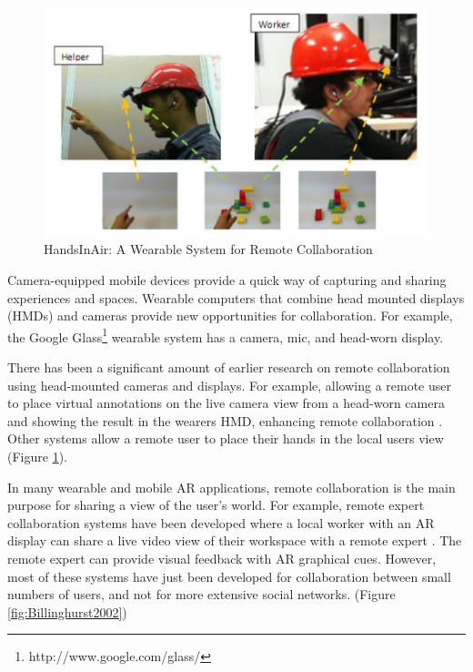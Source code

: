 \begin{figure}
    \centering
    \includegraphics[width=\linewidth]{images/Huang2013.PNG}
    \caption{HandsInAir: A Wearable System for Remote Collaboration}
    \label{fig:HandsInAir}
\end{figure}

Camera-equipped mobile devices provide a quick way of capturing and sharing experiences and spaces. Wearable computers that combine head mounted displays (HMDs) and cameras provide new opportunities for collaboration. For example, the Google Glass\footnote{http://www.google.com/glass/} wearable system has a camera, mic, and head-worn display.

There has been a significant amount of earlier research on remote collaboration using head-mounted cameras and displays. For example, allowing a remote user to place virtual annotations on the live camera view from a head-worn camera and showing the result in the wearers HMD, enhancing remote collaboration \cite{Fussell2003}. Other systems allow a remote user to place their hands in the local users view \cite{Huang2013} (Figure \ref{fig:HandsInAir}). 

In many wearable and mobile AR applications, remote collaboration is the main purpose for sharing a view of the user's world. For example, remote expert collaboration systems have been developed where a local worker with an AR display can share a live video view of their workspace with a remote expert \cite{Billinghurst2002}. The remote expert can provide visual feedback with AR graphical cues.  However, most of these systems have just been developed for collaboration between small numbers of users, and not for more extensive social networks. (Figure \ref{fig:Billinghurst2002})

